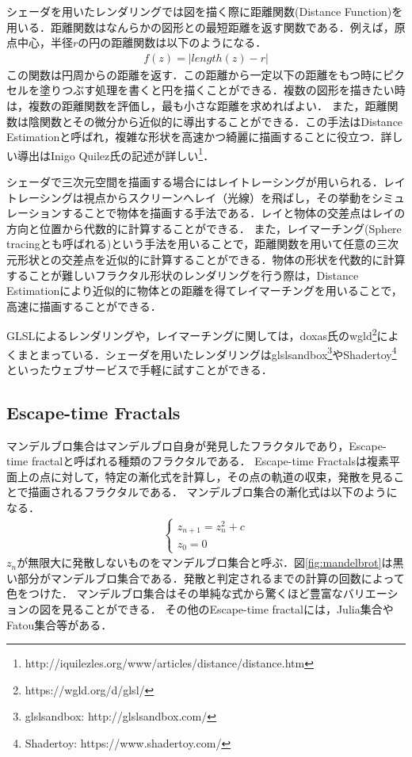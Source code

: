 シェーダを用いたレンダリングでは図を描く際に距離関数(Distance Function)を用いる．距離関数はなんらかの図形との最短距離を返す関数である．例えば，原点中心，半径$r$の円の距離関数は以下のようになる．
\begin{eqnarray*}
 f(z) = | length(z) - r |
\end{eqnarray*}
この関数は円周からの距離を返す．この距離から一定以下の距離をもつ時にピクセルを塗りつぶす処理を書くと円を描くことができる．複数の図形を描きたい時は，複数の距離関数を評価し，最も小さな距離を求めればよい．
また，距離関数は陰関数とその微分から近似的に導出することができる．この手法はDistance Estimationと呼ばれ，複雑な形状を高速かつ綺麗に描画することに役立つ．詳しい導出はInigo Quilez氏の記述が詳しい\footnote{http://iquilezles.org/www/articles/distance/distance.htm}．

シェーダで三次元空間を描画する場合にはレイトレーシングが用いられる．レイトレーシングは視点からスクリーンへレイ（光線）を飛ばし，その挙動をシミュレーションすることで物体を描画する手法である．レイと物体の交差点はレイの方向と位置から代数的に計算することができる．
また，レイマーチング(Sphere tracingとも呼ばれる)\cite{sphereTracing}という手法を用いることで，距離関数を用いて任意の三次元形状との交差点を近似的に計算することができる．物体の形状を代数的に計算することが難しいフラクタル形状のレンダリングを行う際は，Distance Estimationにより近似的に物体との距離を得てレイマーチングを用いることで，高速に描画することができる．

GLSLによるレンダリングや，レイマーチングに関しては，doxas氏のwgld\footnote{https://wgld.org/d/glsl/}によくまとまっている．シェーダを用いたレンダリングはglslsandbox\footnote{glslsandbox: http://glslsandbox.com/}やShadertoy\footnote{Shadertoy: https://www.shadertoy.com/}といったウェブサービスで手軽に試すことができる．

\subsection{Escape-time Fractals}
マンデルブロ集合はマンデルブロ自身が発見したフラクタルであり，Escape-time fractalと呼ばれる種類のフラクタルである．
Escape-time Fractalsは複素平面上の点に対して，特定の漸化式を計算し，その点の軌道の収束，発散を見ることで描画されるフラクタルである．
マンデルブロ集合の漸化式は以下のようになる．
\begin{eqnarray*}
 \begin{cases}
  z_{n+1} = z^2_{n} + c \\ z_0 = 0
 \end{cases}
\end{eqnarray*}
$z_n$が無限大に発散しないものをマンデルブロ集合と呼ぶ．図\ref{fig:mandelbrot}は黒い部分がマンデルブロ集合である．発散と判定されるまでの計算の回数によって色をつけた．
マンデルブロ集合はその単純な式から驚くほど豊富なバリエーションの図を見ることができる．
その他のEscape-time fractalには，Julia集合やFatou集合等がある．

